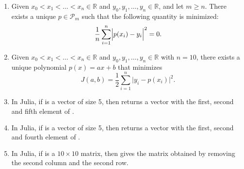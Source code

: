 \documentclass[a4paper]{article}
\begin{document}
\begin{enumerate}
    \item
        Given $x_0 < x_1 < \dotsc < x_n \in \mathbb R$
        and $y_0, y_1, \dotsc , y_n \in \mathbb R$,
        and let $m \geq n$. 
        There exists a unique $p \in \mathcal P_m$ such that the following quantity is minimized:
        \[
            \frac{1}{n} \sum_{i=1}^{n} \Bigl\lvert p(x_i) - y_i \Bigr\rvert^2 = 0.
        \]

    \item
        Given $x_0 < x_1 < \dotsc < x_n \in \mathbb R$
        and $y_0, y_1, \dotsc , y_n \in \mathbb R$ with $n = 10$,
        there exists a unique polynomial $p(x) = ax + b$ that minimizes
        \[
            J(a, b) = \frac{1}{2} \sum_{i=1}^n \bigl\lvert y_i - p(x_i) \bigr\rvert^2.
        \]

    \item
        In Julia, if  is a vector of size 5,
        then  returns a vector with the first, second and fifth element of .

    \item
        In Julia, if  is a vector of size 5,
        then  returns a vector with the first, second and fourth element of .

    \item
        In Julia, if  is a $10\times10$ matrix,
        then  gives the matrix obtained by removing the second column and the second row.
\end{enumerate}
\end{document}
